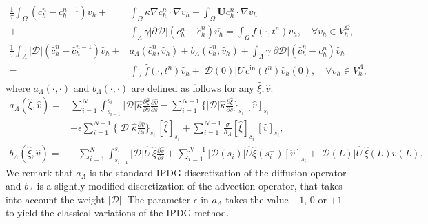 \documentclass[pdflatex,sn-mathphys-num]{sn-jnl}%
\newcommand{\bfU}{{\boldsymbol U}}
\newcommand\numberthis{\addtocounter{equation}{1}\tag{\theequation}}
\theoremstyle{thmstyleone}%
\theoremstyle{thmstyletwo}%
\theoremstyle{thmstylethree}%
\begin{document}
\begin{align}
    \frac{1}{\tau}\int_\Omega (c_h^{n}-c_h^{n-1}) v_h
      +  & \int_\Omega  \kappa \nabla c_h^{n} \cdot \nabla v_h  
       - \int_\Omega \bfU c_h^{n} \cdot \nabla v_h
   \nonumber\\
      +&\int_\Lambda\gamma \vert \partial\mathcal{D}\vert \left(\overline{c_h^{n}}-\hat{c}_h^{n}\right)\overline{v_h}
        = \int_\Omega f(\cdot,t^{n}) v_h, \quad \forall v_h \in V_h^\Omega,\label{eq:FEMscheme}\\
    \frac{1}{\tau} \int_\Lambda |\mathcal{D}|(\hat c_h^{n}- \hat c_h^{n-1}) \hat v_h 
    + & a_\Lambda(\hat c_h^{n}, \hat v_h)
    + b_\Lambda(\hat c_h^{n}, \hat v_h)
    +\int_\Lambda \gamma|\partial\mathcal{D}|\left(\hat c_h^{n}-\overline{c_h^{n}}\right)   \hat v_h
    \nonumber\\
   =  &  \int_\Lambda \hat f(\cdot, t^{n}) \hat v_h
   + |\mathcal{D}(0)|\hat U \, c^{\mathrm{in}}(t^n) \hat v_h(0),
   \quad \forall \hat v_h \in V_h^\Lambda,\label{eq:DGscheme}
\end{align}
where $a_\Lambda(\cdot,\cdot)$ and $b_\Lambda(\cdot,\cdot)$  are defined as follows for any $\hat \xi, \hat v$:
\begin{align*}
  a_\Lambda(\hat \xi, \hat v) = & \sum_{i=1}^N\int_{s_{i-1}}^{s_i}|\mathcal{D}|\hat\kappa \frac{\partial\hat \xi}{\partial s}\frac{\partial \hat v}{\partial s}
    - \sum_{i=1}^{  N-1 } \{|\mathcal{D}|\hat \kappa\frac{\partial \hat \xi}{\partial s}\}_{s_i} \, [\hat v]_{s_i} 
    \\ & -   \epsilon   \sum_{i=1}^{  N-1  } \{|\mathcal{D}|\hat \kappa \frac{\partial \hat v}{\partial s}\}_{s_i} \, [\hat \xi]_{s_i}
    +\sum_{i=1}^{N-1} \frac{\sigma}{h_\Lambda}[\hat \xi]_{s_i} \, [\hat v]_{s_i},  \\  
   b_\Lambda(\hat \xi, \hat v) = &
    -\sum_{i=1}^{N} \int_{s_{i-1}}^{s_i}|\mathcal{D}|\hat U \, \hat \xi \frac{\partial \hat v}{\partial s} 
    +\sum_{i=1}^{  N-1 } \vert\mathcal{D}(s_i)\vert
    \hat U \hat \xi(s_i^-)  [\hat v]_{s_i} 
     +|\mathcal{D}(L)| \hat U \, \hat \xi(L) \hat v(L).
\end{align*}
We remark that $a_\Lambda$ is the standard IPDG discretization of the diffusion operator and $b_\Lambda$ is a slightly modified discretization of the advection operator, that takes into account the weight $\vert \mathcal{D}\vert$.  The parameter $\epsilon$ in $a_\Lambda$ takes the value $-1$, $0$ or $+1$ to yield the classical variations of the IPDG method.
\end{document}
